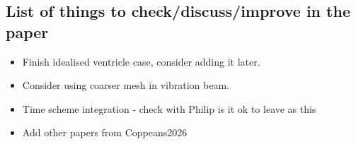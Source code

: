 \documentclass[sn-mathphys,Numbered]{sn-jnl}%
\begin{document}
\begin{appendices}
\section{List of things to check/discuss/improve in the paper}
%
%
\begin{itemize}
\item[•] Finish idealised ventricle case, consider adding it later.
\item[•] Consider using coarser mesh in vibration beam.
\item[•] Time scheme integration - check with Philip is it ok to leave as this
\item[•] Add other papers from 
Coppeans2026
\end{itemize}
\fi
%
%
\end{appendices}
%
%

%
%
\end{document}
